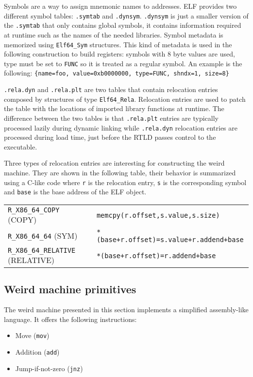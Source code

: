 \documentclass[11pt,twoside,a4paper]{article}
\begin{document}
Symbols are a way to assign mnemonic names to addresses. ELF provides two different symbol tables: \texttt{.symtab} and \texttt{.dynsym}. \texttt{.dynsym} is just a smaller version of the \texttt{.symtab} that only contains global symbols, it contains information required at runtime such as the names of the needed libraries. Symbol metadata is memorized using \texttt{Elf64\_Sym} structures. This kind of metadata is used in the following construction to build registers: symbols with 8 byte values are used, type must be set to \texttt{FUNC} so it is treated as a regular symbol. An example is the following:
\texttt{\{name=foo, value=0xb0000000, type=FUNC, shndx=1, size=8\}}

\texttt{.rela.dyn} and \texttt{.rela.plt} are two tables that contain relocation entries composed by structures of type \texttt{Elf64\_Rela}. Relocation entries are used to patch the table with the locations of imported library functions at runtime. The difference between the two tables is that \texttt{.rela.plt} entries are typically processed lazily during dynamic linking while \texttt{.rela.dyn} relocation entries are processed during load time, just before the RTLD passes control to the executable.

Three types of relocation entries are interesting for constructing the weird machine. They are shown in the following table, their behavior is summarized using a C-like code where \texttt{r} is the relocation entry, \texttt{s} is the corresponding symbol and \texttt{base} is the base address of the ELF object.

\begin{tabular}{ l | l }
  \hline
  \texttt{R\_X86\_64\_COPY} (COPY) & \texttt{memcpy(r.offset,s.value,s.size)} \\
  \texttt{R\_X86\_64\_64} (SYM) & \texttt{*(base+r.offset)=s.value+r.addend+base} \\
  \texttt{R\_X86\_64\_RELATIVE} (RELATIVE) & \texttt{*(base+r.offset)=r.addend+base} \\
  \hline
\end{tabular}


\subsection{Weird machine primitives}

The weird machine presented in this section implements a simplified assembly-like language. It offers the following instructions:
\begin{itemize}
\item Move (\texttt{mov})
\item Addition (\texttt{add})
\item Jump-if-not-zero (\texttt{jnz})
\end{itemize}
\end{document}
